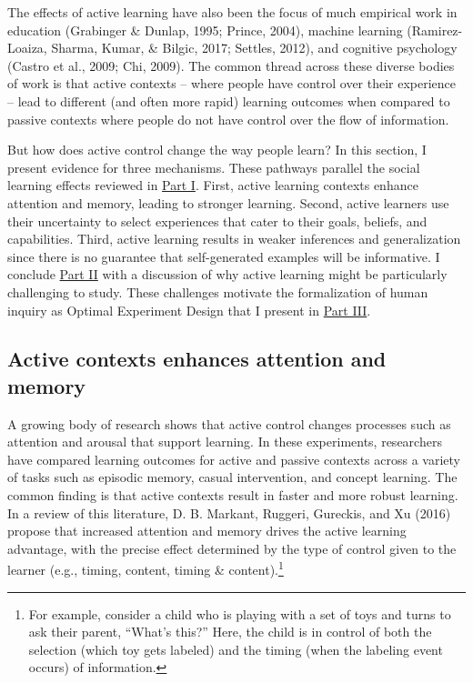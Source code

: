 \documentclass[english,floatsintext,man]{apa6}
\theoremstyle{definition}
\theoremstyle{definition}
\theoremstyle{definition}
\theoremstyle{remark}
\begin{document}
The effects of active learning have also been the focus of much
empirical work in education (Grabinger \& Dunlap, 1995; Prince, 2004),
machine learning (Ramirez-Loaiza, Sharma, Kumar, \& Bilgic, 2017;
Settles, 2012), and cognitive psychology (Castro et al., 2009; Chi,
2009). The common thread across these diverse bodies of work is that
active contexts -- where people have control over their experience --
lead to different (and often more rapid) learning outcomes when compared
to passive contexts where people do not have control over the flow of
information.

But how does active control change the way people learn? In this
section, I present evidence for three mechanisms. These pathways
parallel the social learning effects reviewed in
\protect\hyperlink{p1}{Part I}. First, active learning contexts enhance
attention and memory, leading to stronger learning. Second, active
learners use their uncertainty to select experiences that cater to their
goals, beliefs, and capabilities. Third, active learning results in
weaker inferences and generalization since there is no guarantee that
self-generated examples will be informative. I conclude
\protect\hyperlink{p2}{Part II} with a discussion of why active learning
might be particularly challenging to study. These challenges motivate
the formalization of human inquiry as Optimal Experiment Design that I
present in \protect\hyperlink{p3}{Part III}.

\subsection{Active contexts enhances attention and
memory}\label{active-contexts-enhances-attention-and-memory}

A growing body of research shows that active control changes processes
such as attention and arousal that support learning. In these
experiments, researchers have compared learning outcomes for active and
passive contexts across a variety of tasks such as episodic memory,
casual intervention, and concept learning. The common finding is that
active contexts result in faster and more robust learning. In a review
of this literature, D. B. Markant, Ruggeri, Gureckis, and Xu (2016)
propose that increased attention and memory drives the active learning
advantage, with the precise effect determined by the type of control
given to the learner (e.g., timing, content, timing \&
content).\footnote{For example, consider a child who is playing with a
  set of toys and turns to ask their parent, \enquote{What's this?}
  Here, the child is in control of both the selection (which toy gets
  labeled) and the timing (when the labeling event occurs) of
  information.}
\end{document}
